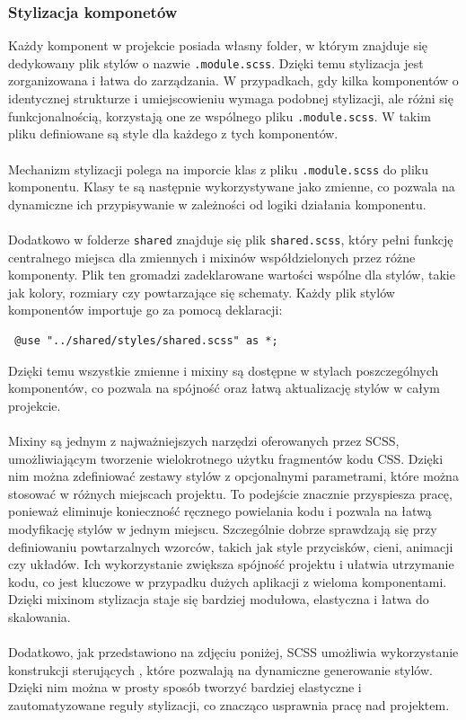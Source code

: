 \documentclass[12pt,a4paper]{article}
\begin{document}
\newpage

\subsubsection{Stylizacja komponetów}

\noindent
Każdy komponent w projekcie posiada własny folder, w którym znajduje się dedykowany plik stylów o nazwie \texttt{.module.scss}. Dzięki temu stylizacja jest zorganizowana i łatwa do zarządzania. W przypadkach, gdy kilka komponentów o identycznej strukturze i umiejscowieniu wymaga podobnej stylizacji, ale różni się funkcjonalnością, korzystają one ze wspólnego pliku \texttt{.module.scss}. W takim pliku definiowane są style dla każdego z tych komponentów.
\\\\
Mechanizm stylizacji polega na imporcie klas z pliku \texttt{.module.scss} do pliku komponentu. Klasy te są następnie wykorzystywane jako zmienne, co pozwala na dynamiczne ich przypisywanie w zależności od logiki działania komponentu.
\\\\
Dodatkowo w folderze \texttt{shared} znajduje się plik \texttt{shared.scss}, który pełni funkcję centralnego miejsca dla zmiennych i mixinów współdzielonych przez różne komponenty. Plik ten gromadzi zadeklarowane wartości wspólne dla stylów, takie jak kolory, rozmiary czy powtarzające się schematy. Każdy plik stylów komponentów importuje go za pomocą deklaracji:

\begin{verbatim} @use "../shared/styles/shared.scss" as *; \end{verbatim}

\noindent
Dzięki temu wszystkie zmienne i mixiny są dostępne w stylach poszczególnych komponentów, co pozwala na spójność oraz łatwą aktualizację stylów w całym projekcie.
\\\\
Mixiny są jednym z najważniejszych narzędzi oferowanych przez SCSS, umożliwiającym tworzenie wielokrotnego użytku fragmentów kodu CSS. Dzięki nim można zdefiniować zestawy stylów z opcjonalnymi parametrami, które można stosować w różnych miejscach projektu. To podejście znacznie przyspiesza pracę, ponieważ eliminuje konieczność ręcznego powielania kodu i pozwala na łatwą modyfikację stylów w jednym miejscu. Szczególnie dobrze sprawdzają się przy definiowaniu powtarzalnych wzorców, takich jak style przycisków, cieni, animacji czy układów. Ich wykorzystanie zwiększa spójność projektu i ułatwia utrzymanie kodu, co jest kluczowe w przypadku dużych aplikacji z wieloma komponentami. Dzięki mixinom stylizacja staje się bardziej modułowa, elastyczna i łatwa do skalowania.
\\\\
Dodatkowo, jak przedstawiono na zdjęciu poniżej, SCSS umożliwia wykorzystanie konstrukcji sterujących , które pozwalają na dynamiczne generowanie stylów. Dzięki nim można w prosty sposób tworzyć bardziej elastyczne i zautomatyzowane reguły stylizacji, co znacząco usprawnia pracę nad projektem.
\end{document}
